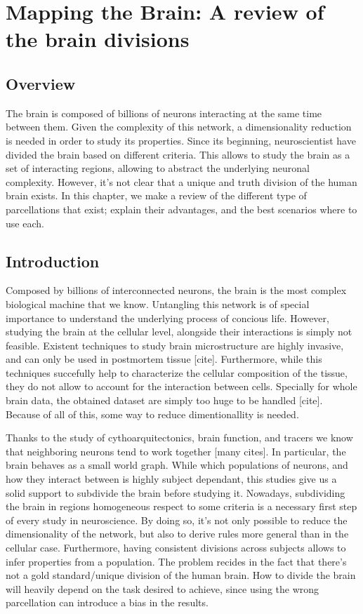 \chapter{Mapping the Brain: A review of the brain divisions}

\section{Overview}
The brain is composed of billions of neurons interacting at the same time
between them. Given the complexity of this network, a dimensionality reduction
is needed in order to study its properties. Since its beginning, neuroscientist
have divided the brain based on different criteria. This allows to study the
brain as a set of interacting regions, allowing to abstract the underlying
neuronal complexity. However, it's not clear that a unique and truth division
of the human brain exists. In this chapter, we make a review of the different
type of parcellations that exist; explain their advantages, and the best
scenarios where to use each.

\section{Introduction}
Composed by billions of interconnected neurons, the brain is the most complex
biological machine that we know. Untangling this network is of special importance
to understand the underlying process of concious life. However, studying the 
brain at the cellular level, alongside their interactions is simply not feasible.
Existent techniques to study brain microstructure are highly invasive, and can
only be used in postmortem tissue [cite]. Furthermore, while this techniques
succefully help to characterize the cellular composition of the tissue, they
do not allow to account for the interaction between cells. Specially for whole
brain data, the obtained dataset are simply too huge to be handled [cite].
Because of all of this, some way to reduce dimentionallity is needed.

Thanks to the study of cythoarquitectonics, brain function, and tracers we know
that neighboring neurons tend to work together [many cites]. In particular,
the brain behaves as a small world graph. While which populations
of neurons, and how they interact between is highly subject dependant, this
studies give us a solid support to subdivide the brain before studying it.
Nowadays, subdividing the brain in regions homogeneous respect to some criteria
is a necessary first step of every study in neuroscience. By doing so, it's not
only possible to reduce the dimensionality of the network, but also to derive
rules more general than in the cellular case. Furthermore, having consistent
divisions across subjects allows to infer properties from a population. The 
problem recides in the fact that there's not a gold standard/unique division of
the human brain. How to divide the brain will heavily depend on the task desired
to achieve, since using the wrong parcellation can introduce a bias in the
results. 

